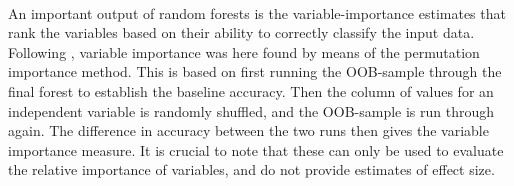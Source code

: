 \documentclass[12pt, a4paper]{article}
\begin{document}
\noindent{}\\ 

An important output of random forests is the variable-importance estimates that rank the variables based on their ability to correctly classify the input data. Following \cite{parr2018}, variable importance was here found by means of the permutation importance method. This is based on first running the OOB-sample through the final forest to establish the baseline accuracy. Then the column of values for an independent variable is randomly shuffled, and the OOB-sample is run through again. The difference in accuracy between the two runs then gives the variable importance measure. It is crucial to note that these can only be used to evaluate the relative importance of variables, and do not provide estimates of effect size. \par
\end{document}
